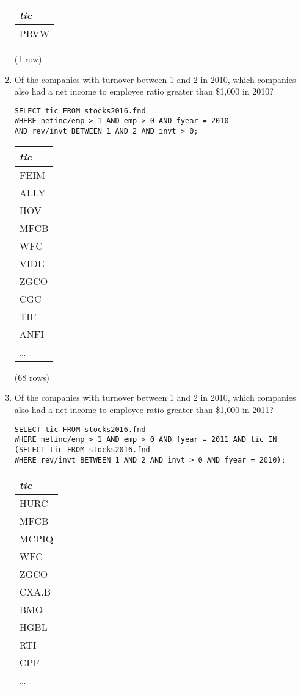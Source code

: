 \documentclass[]{article}
\newenvironment{question}[2][Question]{\begin{trivlist}
\item[\hskip \labelsep {\bfseries #1}\hskip \labelsep {\bfseries #2.}]}{\end{trivlist}}
\begin{document}
\begin{question}{2}
\begin{enumerate}[label=(\alph*)]
\begin{center}
\begin{tabular}{l}
\textit{tic} \\
\hline
PRVW \\
\end{tabular}

\noindent (1 row) \\
\end{center}

\item Of the companies with turnover between 1 and 2 in 2010, which companies also had a net income to employee ratio greater than \$1,000 in 2010?
  \color{blue}
\begin{verbatim}
SELECT tic FROM stocks2016.fnd
WHERE netinc/emp > 1 AND emp > 0 AND fyear = 2010
AND rev/invt BETWEEN 1 AND 2 AND invt > 0;
  \end{verbatim}
\color{black}

\begin{center}
\begin{tabular}{l}
\textit{tic} \\
\hline
FEIM \\
ALLY \\
HOV \\
MFCB \\
WFC \\
VIDE \\
ZGCO \\
CGC \\
TIF \\
ANFI \\
\ldots \\
\end{tabular}

\noindent (68 rows) \\
\end{center}

\item Of the companies with turnover between 1 and 2 in 2010, which companies also had a net income to employee ratio greater than \$1,000 in 2011?
  \color{blue}
\begin{verbatim}
SELECT tic FROM stocks2016.fnd
WHERE netinc/emp > 1 AND emp > 0 AND fyear = 2011 AND tic IN
(SELECT tic FROM stocks2016.fnd
WHERE rev/invt BETWEEN 1 AND 2 AND invt > 0 AND fyear = 2010);
  \end{verbatim}
\color{black}

\begin{center}
\begin{tabular}{l}
\textit{tic} \\
\hline
HURC \\
MFCB \\
MCPIQ \\
WFC \\
ZGCO \\
CXA.B \\
BMO \\
HGBL \\
RTI \\
CPF \\
\ldots \\
\end{tabular}


\end{center}
\end{enumerate}
\end{question}
\end{document}
